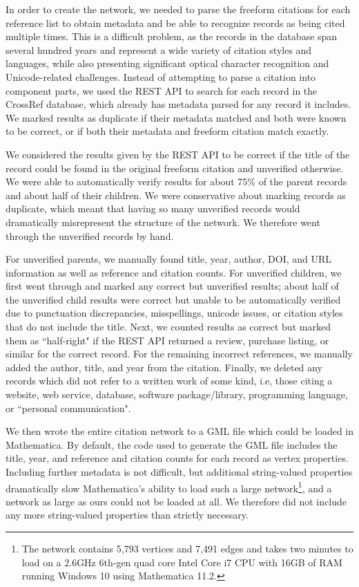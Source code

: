 \documentclass[12pt]{thesis}
\theoremstyle{plain}
\theoremstyle{definition}
\theoremstyle{remark}
\begin{document}
In order to create the network, we needed to parse the freeform citations for each reference list to obtain metadata and be able to recognize records as being cited multiple times. This is a difficult problem, as the records in the database span several hundred years and represent a wide variety of citation styles and languages, while also presenting significant optical character recognition and Unicode-related challenges. Instead of attempting to parse a citation into component parts, we used the REST API \cite{crossrefAPI} to search for each record in the CrossRef database, which already has metadata parsed for any record it includes. We marked results as duplicate if their metadata matched and both were known to be correct, or if both their metadata and freeform citation match exactly. 

We considered the results given by the REST API to be correct if the title of the record could be found in the original freeform citation and unverified otherwise. We were able to automatically verify results for about 75\% of the parent records and about half of their children. We were conservative about marking records as duplicate, which meant that having so many unverified records would dramatically misrepresent the structure of the network. We therefore went through the unverified records by hand.

For unverified parents, we manually found title, year, author, DOI, and URL information as well as reference and citation counts. For unverified children, we first went through and marked any correct but unverified results; about half of the unverified child results were correct but unable to be automatically verified due to punctuation discrepancies, misspellings, unicode issues, or citation styles that do not include the title. Next, we counted results as correct but marked them as ``half-right" if the REST API returned a review, purchase listing, or similar for the correct record. For the remaining incorrect references, we manually added the author, title, and year from the citation. Finally, we deleted any records which did not refer to a written work of some kind, i.e, those citing a website, web service, database, software package/library, programming language, or ``personal communication".

We then wrote the entire citation network to a GML file which could be loaded in Mathematica. By default, the code used to generate the GML file includes the title, year, and reference and citation counts for each record as vertex properties. Including further metadata is not difficult, but additional string-valued properties dramatically slow Mathematica's ability to load such a large network\footnote{The network contains 5,793 vertices and 7,491 edges and takes two minutes to load on a 2.6GHz 6th-gen quad core Intel Core i7 CPU with 16GB of RAM running Windows 10 using Mathematica 11.2.}, and a network as large as ours could not be loaded at all. We therefore did not include any more string-valued properties than strictly necessary.
\end{document}
